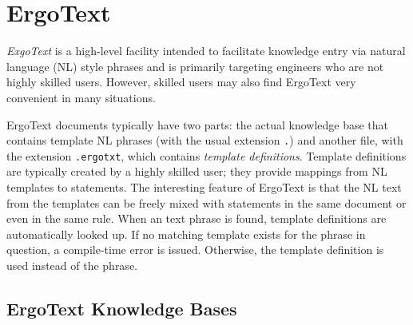 
\section{ErgoText}\label{sec-ergotext}

\emph{ExgoText} is a high-level facility intended to facilitate knowledge
entry via natural language (NL) style phrases and is primarily targeting 
engineers who are not highly skilled \FLSYSTEM users.
However, skilled \FLSYSTEM users may also find ErgoText very convenient in
many situations.

ErgoText documents typically have two parts: the actual knowledge base that
contains template NL phrases (with the usual extension
\texttt{.\flrext}) 
and another file, with the extension \texttt{.ergotxt},  which 
contains \emph{template definitions}.
Template definitions are typically created by a highly skilled \FLSYSTEM
user; they provide mappings from NL templates to \FLSYSTEM
statements. The interesting feature of ErgoText is that the NL text from
the templates
can be freely mixed with \FLSYSTEM statements in the same document or even
in the same rule. When an text phrase is found, template
definitions are automatically looked up. If no matching template exists for the
phrase in question, a compile-time error is issued. Otherwise, the
\FLSYSTEM template definition is used instead of the phrase.

\subsection{ErgoText Knowledge Bases}\label{sec-ergotext-kb}

